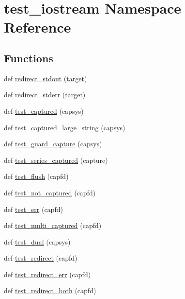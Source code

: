 \hypertarget{namespacetest__iostream}{}\section{test\+\_\+iostream Namespace Reference}
\label{namespacetest__iostream}
\subsection*{Functions}
\begin{DoxyCompactItemize}
\item 
def \mbox{\hyperlink{namespacetest__iostream_ada467f909a6c828ef4f7d2b898d37dad}{redirect\+\_\+stdout}} (\mbox{\hyperlink{_s_d_l__opengl__glext_8h_af9d0cbbbeb7414e786c41899e5a856d7}{target}})
\item 
def \mbox{\hyperlink{namespacetest__iostream_a29964bc8a6a68901b7f7e3b07b289531}{redirect\+\_\+stderr}} (\mbox{\hyperlink{_s_d_l__opengl__glext_8h_af9d0cbbbeb7414e786c41899e5a856d7}{target}})
\item 
def \mbox{\hyperlink{namespacetest__iostream_aeedc57cd3f4261b7f7f83295c6b17346}{test\+\_\+captured}} (capsys)
\item 
def \mbox{\hyperlink{namespacetest__iostream_a6409c0c1a4673ced33b2e62d81f37395}{test\+\_\+captured\+\_\+large\+\_\+string}} (capsys)
\item 
def \mbox{\hyperlink{namespacetest__iostream_af6c25a47a519cbbef51606064eab4ade}{test\+\_\+guard\+\_\+capture}} (capsys)
\item 
def \mbox{\hyperlink{namespacetest__iostream_a75fafd643cf9daf431ca97aaac58c610}{test\+\_\+series\+\_\+captured}} (capture)
\item 
def \mbox{\hyperlink{namespacetest__iostream_a8f01ea728383cbe996897c0507da33ff}{test\+\_\+flush}} (capfd)
\item 
def \mbox{\hyperlink{namespacetest__iostream_a965c54c2196c3bc2051bb644421b61a0}{test\+\_\+not\+\_\+captured}} (capfd)
\item 
def \mbox{\hyperlink{namespacetest__iostream_a2a733c153d02eb598d50118503a28a16}{test\+\_\+err}} (capfd)
\item 
def \mbox{\hyperlink{namespacetest__iostream_a4a86eb8c1924e9050a19bc15b2abcaa1}{test\+\_\+multi\+\_\+captured}} (capfd)
\item 
def \mbox{\hyperlink{namespacetest__iostream_a5e10836e3cd609d7c7307b80f95e9c14}{test\+\_\+dual}} (capsys)
\item 
def \mbox{\hyperlink{namespacetest__iostream_a79835e3a7a59476cb722c0819f2f0ed3}{test\+\_\+redirect}} (capfd)
\item 
def \mbox{\hyperlink{namespacetest__iostream_a7a41310046e2815fddb591115150fb6d}{test\+\_\+redirect\+\_\+err}} (capfd)
\item 
def \mbox{\hyperlink{namespacetest__iostream_a31854318c1519af6eda701c33218b6c9}{test\+\_\+redirect\+\_\+both}} (capfd)
\end{DoxyCompactItemize}



